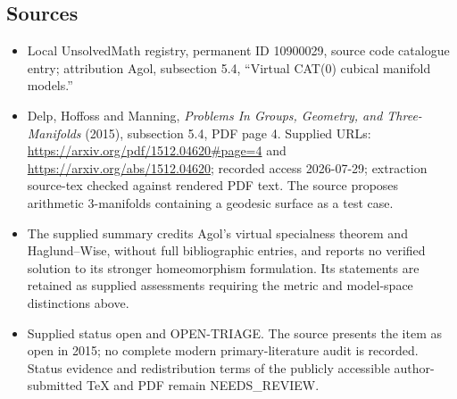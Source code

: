 \documentclass[11pt]{article}
\begin{document}
\subsection{Sources}
\begin{itemize}
\item Local UnsolvedMath registry, permanent ID 10900029, source code catalogue entry; attribution Agol, subsection 5.4, ``Virtual CAT(0) cubical manifold models.''
\item Delp, Hoffoss and Manning, \emph{Problems In Groups, Geometry, and Three-Manifolds} (2015), subsection 5.4, PDF page 4. Supplied URLs: \url{https://arxiv.org/pdf/1512.04620#page=4} and \url{https://arxiv.org/abs/1512.04620}; recorded access 2026-07-29; extraction source-tex checked against rendered PDF text. The source proposes arithmetic \(3\)-manifolds containing a geodesic surface as a test case.
\item The supplied summary credits Agol's virtual specialness theorem and Haglund--Wise, without full bibliographic entries, and reports no verified solution to its stronger homeomorphism formulation. Its statements are retained as supplied assessments requiring the metric and model-space distinctions above.
\item Supplied status open and OPEN-TRIAGE. The source presents the item as open in 2015; no complete modern primary-literature audit is recorded. Status evidence and redistribution terms of the publicly accessible author-submitted TeX and PDF remain NEEDS\_REVIEW.
\end{itemize}
\end{document}
